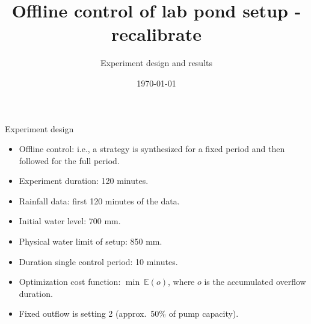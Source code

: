 \documentclass[notheorems,aspectratio=169]{beamer}
\title{Offline control of lab pond setup - recalibrate}
\subtitle{Experiment design and results}
\date{\today}
\begin{document}
%
\begin{frame}
	\titlepage
\end{frame}
%

\begin{frame}{Experiment design}
	\begin{itemize}
		\item Offline control: i.e., a strategy is synthesized for a fixed period and then followed for the full period.
		\item Experiment duration: 120 minutes.
		\item Rainfall data: first 120 minutes of the data.
		\item Initial water level: 700 mm.
		\item Physical water limit of setup: 850 mm.
		\item Duration single control period: 10 minutes.
		\item Optimization cost function: $\min\  \mathbb{E}(o)$, where $o$ is the accumulated overflow duration.
		\item Fixed outflow is setting 2 (approx.\ 50\% of pump capacity).
	\end{itemize}
\end{frame}
\end{document}
